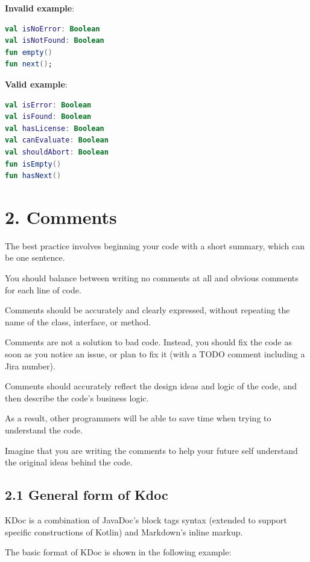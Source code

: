 \textbf{Invalid example}: 

\begin{lstlisting}[language=Kotlin]
val isNoError: Boolean
val isNotFound: Boolean
fun empty()
fun next();
\end{lstlisting}


\textbf{Valid example}:

\begin{lstlisting}[language=Kotlin]
val isError: Boolean
val isFound: Boolean
val hasLicense: Boolean
val canEvaluate: Boolean
val shouldAbort: Boolean
fun isEmpty()
fun hasNext()
\end{lstlisting}
\section*{\textbf{2. Comments}}



The best practice involves beginning your code with a short summary, which can be one sentence.

You should balance between writing no comments at all and obvious comments for each line of code.

Comments should be accurately and clearly expressed, without repeating the name of the class, interface, or method.

Comments are not a solution to bad code. Instead, you should fix the code as soon as you notice an issue, or plan to fix it (with a TODO comment including a Jira number).

Comments should accurately reflect the design ideas and logic of the code, and then describe the code's business logic.

As a result, other programmers will be able to save time when trying to understand the code.

Imagine that you are writing the comments to help your future self understand the original ideas behind the code. 



\subsection*{\textbf{2.1 General form of Kdoc}}

 

KDoc is a combination of JavaDoc's block tags syntax (extended to support specific constructions of Kotlin) and Markdown's inline markup.

The basic format of KDoc is shown in the following example:



